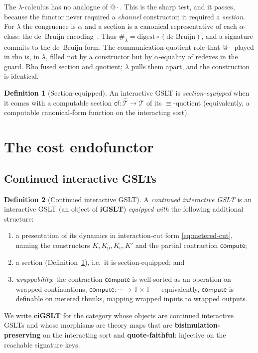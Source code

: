 \documentclass[11pt]{article}
\makeatletter
\theoremstyle{definition}
\newtheorem{definition}{Definition}[section]
\theoremstyle{plain}
\newcommand{\iGSLT}{\mathbf{iGSLT}}
\newcommand{\ciGSLT}{\mathbf{ciGSLT}}
\newcommand{\WT}{\mathbb{T}}                  %
\newcommand{\Seq}{\equiv}
\newcommand{\hashf}{\#}
\newcommand{\quot}[1]{@#1}
\newcommand{\compute}{\mathsf{compute}}
\newcommand{\cf}{\mathsf{cf}}
\newcommand{\Term}{\mathcal{T}}
\newcommand{\cTerm}{\widehat{\mathcal{T}}}
\newcommand{\Kp}{K_{\mathrm{p}}}
\newcommand{\Ke}{K_{\mathrm{e}}}
\makeatother
\begin{document}
The $\lambda$-calculus has no analogue of $\quot{\cdot}$. This is the
sharp test, and it passes, because the functor never required a
\emph{channel} constructor; it required a \emph{section}. For $\lambda$
the congruence is $\alpha$ and a section is a canonical representative of
each $\alpha$-class: the de~Bruijn encoding~\cite{deBruijn1972}. Thus
$\hashf_\lambda = \mathrm{digest}\circ(\text{de~Bruijn})$, and a signature
commits to the de~Bruijn form. The communication-quotient role that
$\quot{\cdot}$ played in rho is, in $\lambda$, filled not by a constructor
but by $\alpha$-equality of redexes in the guard. Rho fused section and
quotient; $\lambda$ pulls them apart, and the construction is identical.

\begin{definition}[Section-equipped]
\label{def:section}
An interactive GSLT is \emph{section-equipped} when it comes with a
computable section $\cf : \cTerm \to \Term$ of its $\Seq$-quotient
(equivalently, a computable canonical-form function on the interacting
sort).
\end{definition}

\section{The cost endofunctor}
\label{sec:functor}

\subsection{Continued interactive GSLTs}

\begin{definition}[Continued interactive GSLT]
\label{def:ciGSLT}
A \emph{continued interactive GSLT} is an interactive GSLT (an object of
$\iGSLT$) \emph{equipped with} the following additional structure:
\begin{enumerate}[label=(\roman*),itemsep=1pt]
  \item a presentation of its dynamics in interaction-cut form
    \eqref{eq:metered-cut}, naming the constructors $K, \Kp, \Ke, K'$
    and the partial contraction $\compute$;
  \item a section (Definition~\ref{def:section}), i.e.\ it is
    section-equipped; and
  \item \emph{wrappability}: the contraction $\compute$ is well-sorted as
    an operation on wrapped continuations,
    $\compute : \cdots \to \WT\times\WT$ --- equivalently, $\compute$ is
    definable on metered thunks, mapping wrapped inputs to wrapped
    outputs.
\end{enumerate}
We write $\ciGSLT$ for the category whose objects are continued
interactive GSLTs and whose morphisms are theory maps that are
\textbf{bisimulation-preserving} on the interacting sort and
\textbf{quote-faithful}: injective on the reachable signature keys.
\end{definition}
\end{document}
